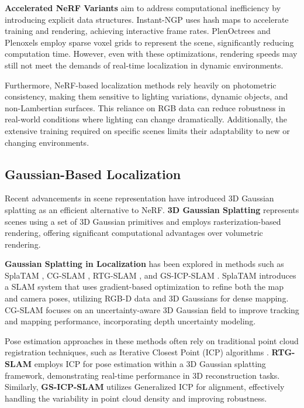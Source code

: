 \documentclass[twocolumn]{article}
\begin{document}
\textbf{Accelerated NeRF Variants} aim to address computational
inefficiency by introducing explicit data structures. Instant-NGP
\autocite{mullerInstantNeuralGraphics2022} uses hash maps to accelerate
training and rendering, achieving interactive frame rates. PlenOctrees
\autocite{yuPlenoctreesRealtimeRendering2021} and Plenoxels
\autocite{fridovich-keilPlenoxelsRadianceFields2022} employ sparse voxel
grids to represent the scene, significantly reducing computation time.
However, even with these optimizations, rendering speeds may still not
meet the demands of real-time localization in dynamic environments.

Furthermore, NeRF-based localization methods rely heavily on photometric
consistency, making them sensitive to lighting variations, dynamic
objects, and non-Lambertian surfaces. This reliance on RGB data can
reduce robustness in real-world conditions where lighting can change
dramatically. Additionally, the extensive training required on specific
scenes limits their adaptability to new or changing environments.

\subsection{Gaussian-Based
Localization}\label{gaussian-based-localization}

Recent advancements in scene representation have introduced 3D Gaussian
splatting as an efficient alternative to NeRF. \textbf{3D Gaussian
Splatting} \autocite{kerbl3DGaussianSplatting2023} represents scenes
using a set of 3D Gaussian primitives and employs rasterization-based
rendering, offering significant computational advantages over volumetric
rendering.

\textbf{Gaussian Splatting in Localization} has been explored in methods
such as SplaTAM \autocite{keethaSplaTAMSplatTrack2024}, CG-SLAM
\autocite{huCGSLAMEfficientDense2024}, RTG-SLAM
\autocite{pengRTGSLAMRealtime3D2024}, and GS-ICP-SLAM
\autocite{haRGBDGSICPSLAM2024}. SplaTAM introduces a SLAM system that
uses gradient-based optimization to refine both the map and camera
poses, utilizing RGB-D data and 3D Gaussians for dense mapping. CG-SLAM
focuses on an uncertainty-aware 3D Gaussian field to improve tracking
and mapping performance, incorporating depth uncertainty modeling.

Pose estimation approaches in these methods often rely on traditional
point cloud registration techniques, such as Iterative Closest Point
(ICP) algorithms \autocite{beslMethodRegistration3shapes1992}.
\textbf{RTG-SLAM}\autocite{pengRTGSLAMRealtime3D2024} employs ICP for
pose estimation within a 3D Gaussian splatting framework, demonstrating
real-time performance in 3D reconstruction tasks. Similarly,
\textbf{GS-ICP-SLAM} utilizes Generalized ICP
\autocite{segalGeneralizedicp2009a} for alignment, effectively handling
the variability in point cloud density and improving robustness.
\end{document}

